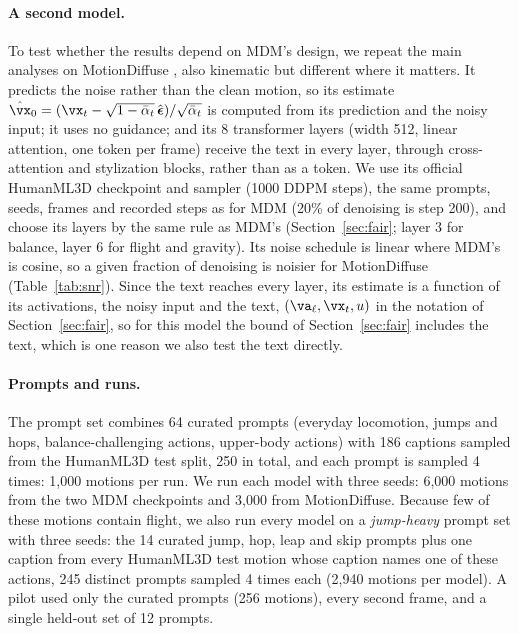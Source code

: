 \paragraph{A second model.} To test whether the results depend on MDM's design, we repeat the main analyses on MotionDiffuse \citep{zhang2022motiondiffuse}, also kinematic but different where it matters. It predicts the noise rather than the clean motion, so its estimate $\hat\vx_0 = (\vx_t - \sqrt{1-\bar\alpha_t}\,\hat{\boldsymbol\epsilon})/\sqrt{\bar\alpha_t}$ is computed from its prediction and the noisy input; it uses no guidance; and its 8 transformer layers (width 512, linear attention, one token per frame) receive the text in every layer, through cross-attention and stylization blocks, rather than as a token. We use its official HumanML3D checkpoint and sampler (1000 DDPM steps), the same prompts, seeds, frames and recorded steps as for MDM (20\% of denoising is step 200), and choose its layers by the same rule as MDM's (Section~\ref{sec:fair}; layer 3 for balance, layer 6 for flight and gravity). Its noise schedule is linear where MDM's is cosine, so a given fraction of denoising is noisier for MotionDiffuse (Table~\ref{tab:snr}). Since the text reaches every layer, its estimate is a function of its activations, the noisy input and the text, $(\va_\ell, \vx_t, u)$ in the notation of Section~\ref{sec:fair}, so for this model the bound of Section~\ref{sec:fair} includes the text, which is one reason we also test the text directly.

\paragraph{Prompts and runs.} The prompt set combines 64 curated prompts (everyday locomotion, jumps and hops, balance-challenging actions, upper-body actions) with 186 captions sampled from the HumanML3D test split, 250 in total, and each prompt is sampled 4 times: 1,000 motions per run. We run each model with three seeds: 6,000 motions from the two MDM checkpoints and 3,000 from MotionDiffuse. Because few of these motions contain flight, we also run every model on a \emph{jump-heavy} prompt set with three seeds: the 14 curated jump, hop, leap and skip prompts plus one caption from every HumanML3D test motion whose caption names one of these actions, 245 distinct prompts sampled 4 times each (2,940 motions per model). A pilot used only the curated prompts (256 motions), every second frame, and a single held-out set of 12 prompts.

